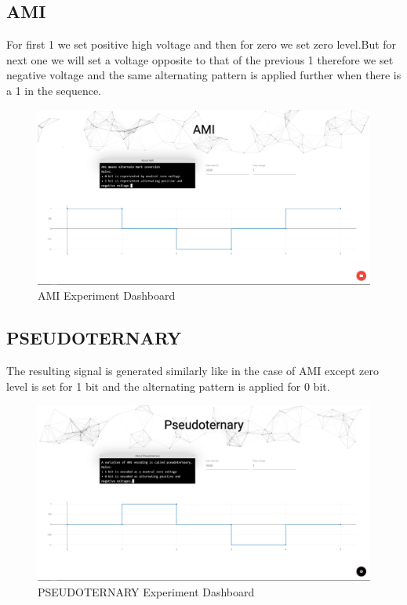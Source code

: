 \documentclass[10pt,journal,compsoc]{IEEEtran}
\begin{document}
\subsection{AMI}

For first 1 we set positive high voltage and then for zero we set zero level.But for next one we will set a voltage opposite to that of the previous 1 therefore we set  negative voltage and the same alternating pattern is applied further when there is a 1 in the sequence.

\begin{figure}[H]
\centering
\includegraphics[scale=0.15]{AMI.png}
\caption{AMI Experiment Dashboard}
\end{figure}


\subsection{PSEUDOTERNARY}

The resulting signal is generated similarly like in the case of AMI except zero level is set for 1 bit and the alternating pattern is applied for 0 bit.

\begin{figure}[H]
\centering
\includegraphics[scale=0.15]{pseudoternary.png}
\caption{PSEUDOTERNARY Experiment Dashboard}
\end{figure}
\end{document}
